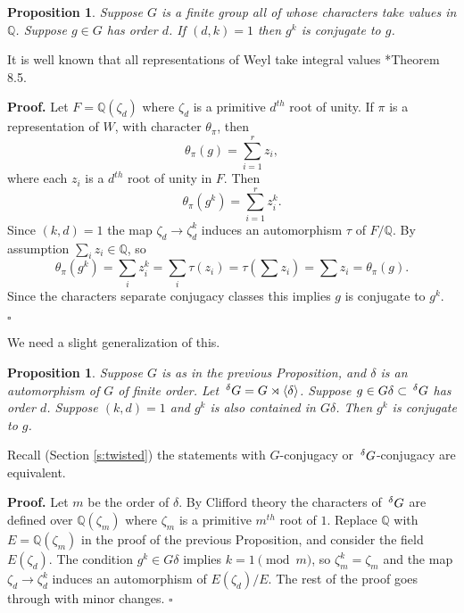 \documentclass[10pt,leqno]{article}
\newtheorem{proposition}[equation]{Proposition}
\newcommand{\qed}{\hfill $\square$ \medskip}
\newenvironment{proof}[1][Proof]{\noindent\textbf{#1.} }{\qed}
\newcommand{\Q}{\mathbb Q}
\newcommand{\Gext}{\negthinspace\negthinspace\phantom{a}^\delta G}
\begin{document}
\begin{proposition}
Suppose $G$ is a finite group all of whose characters take values in $\Q$. 
Suppose $g\in G$ has order $d$. If $(d,k)=1$ then 
 $g^k$ is conjugate to $g$.
\end{proposition}

It is well known that all representations of Weyl take integral values \cite{springer_regular}*{Theorem 8.5}.

\medskip

\begin{proof}
Let $F=\Q(\zeta_d)$ where $\zeta_d$ is a primitive $d^{th}$ root of unity.
If $\pi$ is a representation of $W$, with character $\theta_\pi$, then
$$
\theta_\pi(g)=\sum_{i=1}^r z_i,
$$
where each $z_i$ is a $d^{th}$ root of unity in $F$. Then
$$
\theta_\pi(g^k)=\sum_{i=1}^r z_i^k.
$$
Since $(k,d)=1$ the map $\zeta_d\rightarrow \zeta_d^k$ induces an automorphism $\tau$ of
$F/\Q$. By assumption  $\sum_i z_i\in \Q$, so
$$
\theta_\pi(g^k)=\sum_i z_i^k=\sum_i \tau(z_i)=\tau(\sum z_i)=\sum z_i=\theta_\pi(g).
$$
Since the characters separate conjugacy classes this implies $g$ is conjugate to $g^k$.

\end{proof}

We need a slight generalization of this.

\begin{proposition}
  \label{p:g^k}
Suppose $G$ is as in the previous Proposition, and  $\delta$
is an automorphism of $G$ of finite order. 
Let $\Gext=G\rtimes\langle\delta\rangle$. Suppose
$g\in G\delta\subset \Gext$ has order $d$.
Suppose $(k,d)=1$ and $g^k$ is also contained in $G\delta$. 
Then $g^k$ is conjugate to $g$.
\end{proposition}

Recall (Section \ref{s:twisted}) the statements with $G$-conjugacy or
$\Gext$-conjugacy are equivalent.

\begin{proof}
  Let $m$ be the order of $\delta$. By Clifford theory the characters of $\Gext$ are defined over
  $\Q(\zeta_m)$ where $\zeta_m$ is a primitive $m^{th}$ root of $1$.
  Replace $\Q$ with $E=\Q(\zeta_m)$ in the proof of the previous
  Proposition, and consider the field $E(\zeta_d)$. 
  The condition $g^k\in G\delta$ implies $k=1\pmod m$, so $\zeta_m^k=\zeta_m$ and 
  the map $\zeta_d\rightarrow \zeta_d^k$ induces an automorphism of $E(\zeta_d)/E$.
The  rest of the proof goes through with minor changes.
\end{proof}
\end{document}
